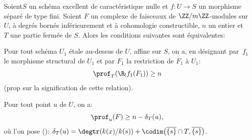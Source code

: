 \setcounter{subsection}{1}

\begin{theoreme} \label{XIV.4.2}
Soient\pageoriginale $S$ un sch\'ema excellent de caract\'eristique nulle et \hbox{$f\colon U\!\to\! S$} un morphisme s\'epar\'e de type fini. Soient $F$ un complexe de faisceaux de $\ZZ/m\ZZ$-modules sur $U$, \`a degr\'es born\'es inf\'erieurement et \`a cohomologie constructible, $n$ un entier et~$T$ une partie ferm\'ee de $S$. Alors les conditions suivantes sont \'equivalentes:
\begin{enumeratei}
\item
Pour tout sch\'ema $U_{1}$ \'etale au-dessus de $U$, affine sur $S$, on a, en d\'esignant par~$f_{1}$ le morphisme structural de $U_{1}$ et par $F_{1}$ la restriction de $F_{1}$ \`a $U_{1}$:
$$
\prof_{T}(\R_{!}f_{1}(F_{1}))\geq n$$
(\cf prop\ptbl {} sur la signification de cette relation).
\item
Pour tout point $u$ de $U$, on a:
$$
\prof_{u}(F)\geq n-\delta_{T}(u),
$$
o\`u l'on pose (\cf {}): $\delta_{T}(u)=\degtr(k(x)/k(s))+\codim\big(\overline{\{ s\} }\cap T, \overline{\{ s\} } \big)$.
\end{enumeratei}
\end{theoreme}

